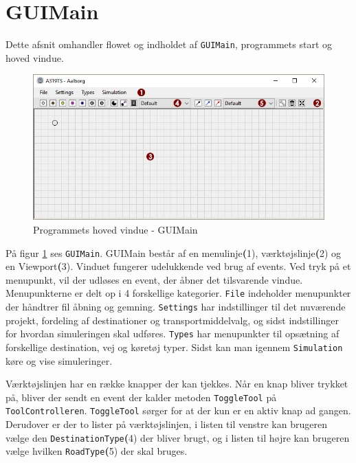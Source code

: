 \section{GUIMain}\label{HovedBrugerfladen}
Dette afsnit omhandler flowet og indholdet af \texttt{GUIMain}, programmets start og hoved vindue. 

\begin{figure}[!h]
    \centering
    \includegraphics[width=\textwidth,height=\textheight,keepaspectratio]{Pictures/Implementation/program2}
    \caption{Programmets hoved vindue - GUIMain}
    \label{a319program}
\end{figure}

På figur \ref{a319program} ses \texttt{GUIMain}. GUIMain består af en menulinje\textbf(1), værktøjslinje\textbf(2) og en Viewport\textbf(3). Vinduet fungerer udelukkende ved brug af events. Ved tryk på et menupunkt, vil der udløses en event, der åbner det tilsvarende vindue. Menupunkterne er delt op i 4 forskellige kategorier. \texttt{File} indeholder menupunkter der håndtrer fil åbning og gemning. \texttt{Settings} har indstillinger til det nuværende projekt, fordeling af destinationer og transportmiddelvalg, og sidst indstillinger for hvordan simuleringen skal udføres. \texttt{Types} har menupunkter til opsætning af forskellige destination, vej og køretøj typer. Sidst kan man igennem \texttt{Simulation} køre og vise simuleringer.

\vspace{5mm}

Værktøjslinjen har en række knapper der kan tjekkes. Når en knap bliver trykket på, bliver der sendt en event der kalder metoden \texttt{ToggleTool} på \newline \texttt{ToolControlleren}. \texttt{ToggleTool} sørger for at der kun er en aktiv knap ad gangen. Derudover er der to lister på værktøjslinjen, i listen til venstre kan brugeren vælge den \texttt{DestinationType}\textbf(4) der bliver brugt, og i listen til højre kan brugeren vælge hvilken \texttt{RoadType}\textbf(5) der skal bruges.

